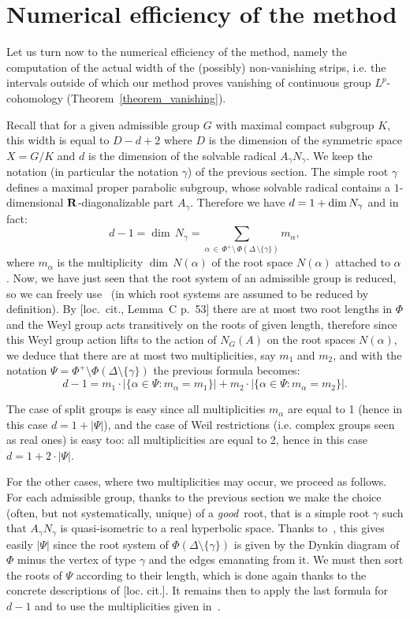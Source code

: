 \section{Numerical efficiency of the method}\label{8}

Let us turn now to the numerical efficiency of the method, namely the computation of the actual width of the (possibly) non-vanishing strips, i.e. the intervals outside of which our method proves vanishing of continuous group $L^p$-cohomology (Theorem~\ref{theorem_vanishing}).

Recall that for a given admissible group $G$ with maximal compact subgroup $K$, this width is equal to $D-d+2$ where $D$ is the dimension of the symmetric space $X=G/K$ and $d$ is the dimension of the solvable radical $A_\gamma N_\gamma$. We keep the notation (in particular the notation $\gamma$) of the previous section. The simple root $\gamma$ defines a maximal proper parabolic subgroup, whose solvable radical contains a $1$-dimensional ${\bf R}$-diagonalizable part $A_\gamma$. Therefore we have $d = 1 + {\rm dim} \, N_\gamma$ and in fact:
\[
d-1 = {\dim} \, N_\gamma = \sum_{\alpha\,\in\, \Phi^+ \setminus\,\Phi(\Delta\,\setminus \{ \gamma \})}m_\alpha,
\]
where $m_\alpha$ is the multiplicity ${\dim} \, N(\alpha)$ of the root space $N(\alpha)$ attached to $\alpha$. Now, we have just seen that the root system of an admissible group is reduced, so we can freely use~\cite{Humphreys-LA} (in which root systems are assumed to be reduced by definition). By [loc.~cit., Lemma~C p.~53] there are at most two root lengths in $\Phi$ and the Weyl group acts transitively on the roots of given length, therefore since this Weyl group action lifts to the action of $N_G(A)$ on the root spaces $N(\alpha)$, we deduce that there are at most two multiplicities, say $m_1$ and $m_2$, and with the notation $\Psi = \Phi^+ \setminus \Phi(\Delta \setminus \{ \gamma \})$ the previous formula becomes:
\[
d-1 =
m_1 \cdot | \{\alpha \in \Psi : m_\alpha = m_1 \}| +
m_2 \cdot | \{\alpha \in \Psi : m_\alpha = m_2 \}|.
\]

The case of split groups is easy since all multiplicities $m_\alpha$ are equal to 1 (hence in this case $d=1 + |\Psi|$), and the case of Weil restrictions (i.e. complex groups seen as real ones) is easy too: all multiplicities are equal to 2, hence in this case $d=1 + 2 \cdot |\Psi|$.

For the other cases, where two multiplicities may occur, we proceed as follows. For each admissible group, thanks to the previous section we make the choice (often, but not systematically, unique) of a \emph{good}~root, that is a simple root $\gamma$ such that $A_\gamma N_\gamma$ is quasi-isometric to a real hyperbolic space. Thanks to~\cite[Planches]{BBK-Lie-4to6}, this gives easily $|\Psi|$ since the root system of $\Phi(\Delta \setminus \{ \gamma \})$ is given by the Dynkin diagram of $\Phi$ minus the vertex of type $\gamma$ and the edges emanating from it. We must then sort the roots of $\Psi$ according to their length, which is done again thanks to the concrete descriptions of [loc. cit.]. It remains then to apply the last formula for $d-1$ and to use the multiplicities given in~\cite[Table~VI, pp.~532--534]{Helgason}.


